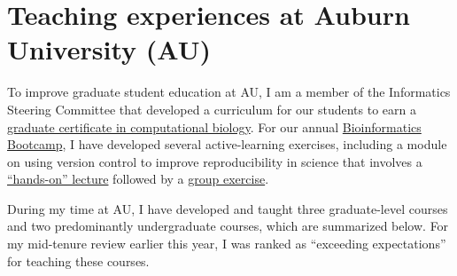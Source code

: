 
\section*{Teaching experiences at Auburn University (AU)}
To improve graduate student education at AU,
I am a member of the Informatics Steering Committee that developed a
curriculum for our students to earn a
\href{http://bulletin.auburn.edu/thegraduateschool/graduatedegreesoffered/biologicalsciencesmsphd_major/computationalbiology_gradcert/}{graduate certificate in computational biology}.
For our annual
\href{http://www.auburn.edu/cosam/bioinformatics/}{Bioinformatics Bootcamp},
I have developed several active-learning exercises,
including a module on using version control to improve reproducibility in
science that involves a
\href{http://phyletica.org/slides/git-intro/}{``hands-on'' lecture}
followed by a
\href{https://github.com/joaks1/au-bootcamp-git-intro}{group exercise}.

During my time at AU,
I have developed and taught three graduate-level courses
and two predominantly undergraduate courses,
which are summarized below.
For my mid-tenure review earlier this year, I was ranked as ``exceeding
expectations'' for teaching these courses.

